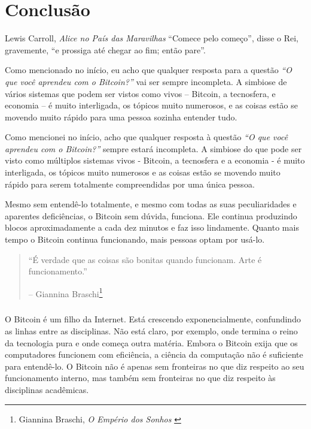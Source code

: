 
\label{ch:conclusion}

\chapter*{Conclusão}

\begin{chapquote}{Lewis Carroll, \textit{Alice no País das Maravilhas}}
\enquote{Comece pelo começo}, disse o Rei, gravemente, \enquote{e prossiga até chegar ao fim; então pare}.

\end{chapquote}
Como mencionado no início, eu acho que qualquer resposta para a questão 
\textit{“O que você aprendeu com o Bitcoin?”} vai ser sempre incompleta. 
A simbiose de vários sistemas que podem ser vistos como vivos -- Bitcoin, 
a tecnosfera, e economia -- é muito interligada, os tópicos muito numerosos, e 
as coisas estão se movendo muito rápido para uma pessoa sozinha entender tudo.

Como mencionei no início, acho que qualquer resposta à questão \textit{“O que você aprendeu com o Bitcoin?”} sempre estará incompleta. A simbiose do que pode ser visto como múltiplos sistemas vivos - Bitcoin, a tecnosfera e a economia - é muito interligada, os tópicos muito numerosos e as coisas estão se movendo muito rápido para serem totalmente compreendidas por uma única pessoa.

Mesmo sem entendê-lo totalmente, e mesmo com todas as suas peculiaridades e aparentes deficiências, o Bitcoin sem dúvida, funciona. Ele continua produzindo blocos aproximadamente a cada dez minutos e faz isso lindamente. Quanto mais tempo o Bitcoin continua funcionando, mais pessoas optam por usá-lo.

\begin{quotation}\begin{samepage}
\enquote{É verdade que as coisas são bonitas quando funcionam. Arte é funcionamento.}
\begin{flushright} -- Giannina Braschi\footnote{Giannina Braschi, \textit{O Empério dos Sonhos} \cite{braschi2011empire}}
\end{flushright}\end{samepage}\end{quotation}

\paragraph{}
O Bitcoin é um filho da Internet. Está crescendo exponencialmente, confundindo as linhas entre as disciplinas. Não está claro, por exemplo, onde termina o reino da tecnologia pura e onde começa outra matéria. Embora o Bitcoin exija que os computadores funcionem com eficiência, a ciência da computação não é suficiente para entendê-lo. O Bitcoin não é apenas sem fronteiras no que diz respeito ao seu funcionamento interno, mas também sem fronteiras no que diz respeito às disciplinas acadêmicas.

